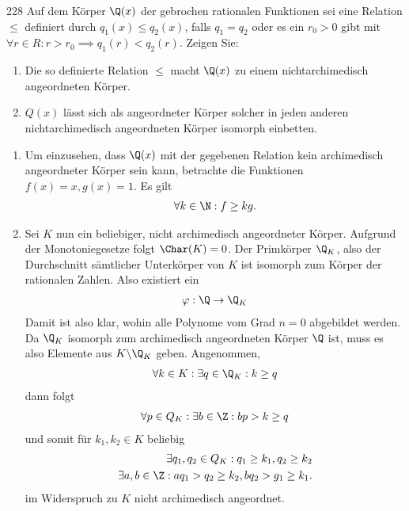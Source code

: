 \begin{algebraUE}{228}
Auf dem Körper $\Q(x)$ der gebrochen rationalen Funktionen sei eine Relation $\leq$
definiert durch $q_1(x) \leq q_2(x)$, falls $q_1 = q_2$ oder es ein $r_0 > 0$ gibt
mit $\forall r \in R: r > r_0 \implies q_1(r) < q_2(r)$. Zeigen Sie:
\begin{enumerate}
  \item Die so definierte Relation $\leq$ macht $\Q(x)$ zu einem nichtarchimedisch
  angeordneten Körper.
  \item $Q(x)$ lässt sich als angeordneter Körper solcher in jeden anderen
  nichtarchimedisch angeordneten Körper isomorph einbetten.
\end{enumerate}
\end{algebraUE}
\begin{solution}
\begin{enumerate}
  \item Um einzusehen, dass $\Q(x)$ mit der gegebenen Relation kein archimedisch angeordneter
  Körper sein kann, betrachte die Funktionen $f(x) = x, g(x) = 1$. Es gilt
  \begin{align*}
    \forall k \in \N: f \geq kg.
  \end{align*}
  \item Sei $K$ nun ein beliebiger, nicht archimedisch angeordneter Körper.
  Aufgrund der Monotoniegesetze folgt $\Char(K) = 0$.
  Der Primkörper $\Q_K$, also der Durchschnitt sämtlicher Unterkörper von $K$
  ist isomorph zum Körper der rationalen Zahlen. Also existiert ein
  \begin{align*}
    \varphi: \Q \to \Q_K
  \end{align*}
  Damit ist also klar, wohin
  alle Polynome vom Grad $n = 0$ abgebildet werden.
  Da $\Q_K$ isomorph zum archimedisch angeordneten Körper $\Q$ ist,
  muss es also Elemente aus $K \backslash \Q_K$ geben.
  Angenommen,
  \begin{align*}
    \forall k \in K: \exists q \in \Q_K: k \geq q
  \end{align*}
  dann folgt
  \begin{align*}
    \forall p \in Q_K: \exists b \in \Z: bp > k \geq q
  \end{align*}
  und somit für $k_1, k_2 \in K$ beliebig
  \begin{align*}
    \exists q_1,q_2 \in Q_K: q_1 \geq k_1, q_2 \geq k_2 \\
    \exists a,b \in \Z: aq_1 > q_2 \geq k_2, bq_2 > g_1 \geq k_1.
  \end{align*}
  im Widerspruch zu $K$ nicht archimedisch angeordnet.

\end{enumerate}
\end{solution}
